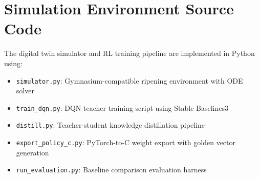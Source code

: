 \section{Simulation Environment Source Code}

    The digital twin simulator and RL training pipeline are implemented in Python using:
    \begin{itemize}
        \item \texttt{simulator.py}: Gymnasium-compatible ripening environment with ODE solver
        \item \texttt{train\_dqn.py}: DQN teacher training script using Stable Baselines3
        \item \texttt{distill.py}: Teacher-student knowledge distillation pipeline
        \item \texttt{export\_policy\_c.py}: PyTorch-to-C weight export with golden vector generation
        \item \texttt{run\_evaluation.py}: Baseline comparison evaluation harness
    \end{itemize}

